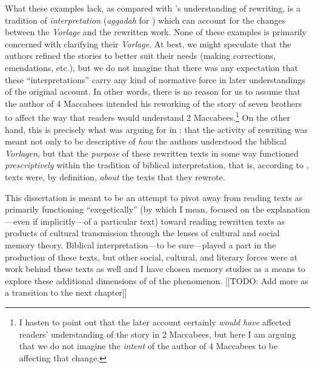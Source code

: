 What these examples lack, as compared with \vermes's understanding of rewriting, is a tradition of \emph{interpretation} (\emph{aggadah} for \vermes) which can account for the changes between the \emph{Vorlage} and the rewritten work. None of these examples is primarily concerned with clarifying their \emph{Vorlage}. At best, we might speculate that the authors refined the stories to better suit their needs (making corrections, emendations, etc.), but we do not imagine that there was any expectation that these ``interpretations'' carry any kind of normative force in later understandings of the original account. In other words, there is no reason for us to assume that the author of 4 Maccabees intended his reworking of the story of seven brothers to affect the way that readers would understand 2 Maccabees.\footnote{I hasten to point out that the later account   certainly \emph{would have} affected readers' understanding of the   story in 2 Maccabees, but here I am arguing that we do not imagine the   \emph{intent} of the author of 4 Maccabees to be affecting that   change.} On the other hand, this is precisely what \vermes was arguing for in : that the activity of rewriting was meant not only to be descriptive of \emph{how} the authors understood the biblical \emph{Vorlagen}, but that the \emph{purpose} of these rewritten texts in some way functioned \emph{prescriptively} within the tradition of biblical interpretation, that is, according to \vermes, \rwb texts were, by definition, \emph{about} the texts that they rewrote. 



This dissertation is meant to be an attempt to pivot away from reading \rwb texts as primarily functioning ``exegetically'' (by which I mean, focused on the explanation---even if implicitly---of a particular text) toward reading rewritten texts as products of cultural transmission through the lenses of cultural and social memory theory. Biblical interpretation---to be sure---played a part in the production of these texts, but other social, cultural, and literary forces were at work behind these texts as well and I have chosen memory studies as a means to explore these additional dimensions of of the \rwb phenomenon. [[TODO: Add more as a transition to the next chapter]]